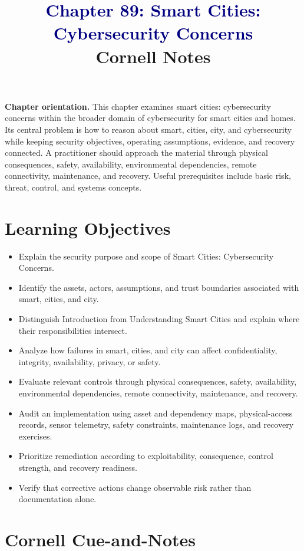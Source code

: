 \documentclass[11pt]{article}
\title{\textcolor{Navy}{Chapter 89: Smart Cities: Cybersecurity Concerns}\\[2mm]\large Cornell Notes}
\author{}
\date{}
\begin{document}
\maketitle
\thispagestyle{fancy}
\vspace{-1.5em}
\begin{orientationbox}
\textbf{Chapter orientation.} This chapter examines smart cities: cybersecurity concerns within the broader domain of cybersecurity for smart cities and homes. Its central problem is how to reason about smart, cities, city, and cybersecurity while keeping security objectives, operating assumptions, evidence, and recovery connected. A practitioner should approach the material through physical consequences, safety, availability, environmental dependencies, remote connectivity, maintenance, and recovery. Useful prerequisites include basic risk, threat, control, and systems concepts.
\end{orientationbox}
\section*{Learning Objectives}
\begin{itemize}
\item Explain the security purpose and scope of Smart Cities: Cybersecurity Concerns.
\item Identify the assets, actors, assumptions, and trust boundaries associated with smart, cities, and city.
\item Distinguish Introduction from Understanding Smart Cities and explain where their responsibilities intersect.
\item Analyze how failures in smart, cities, and city can affect confidentiality, integrity, availability, privacy, or safety.
\item Evaluate relevant controls through physical consequences, safety, availability, environmental dependencies, remote connectivity, maintenance, and recovery.
\item Audit an implementation using asset and dependency maps, physical-access records, sensor telemetry, safety constraints, maintenance logs, and recovery exercises.
\item Prioritize remediation according to exploitability, consequence, control strength, and recovery readiness.
\item Verify that corrective actions change observable risk rather than documentation alone.
\end{itemize}
\section*{Cornell Cue-and-Notes}
\end{document}
